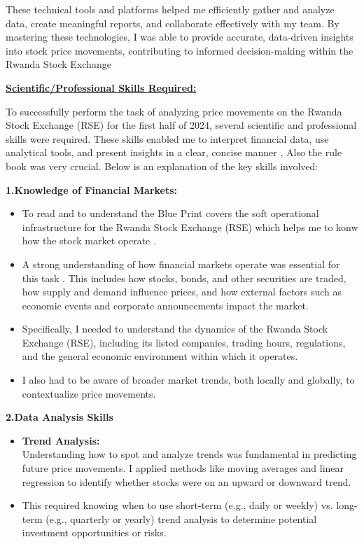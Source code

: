 \documentclass{article}
\begin{document}
\begin{titlepage}
\begin{titlepage}
\begin{flushleft}
These technical tools and platforms helped me efficiently gather and analyze data, create meaningful reports, and collaborate effectively with my team. By mastering these technologies, I was able to provide accurate, data-driven insights into stock price movements, contributing to informed decision-making within the Rwanda Stock Exchange

\vspace{0.5cm}

\newpage

\begin{flushleft}
    \textbf{\underline{Scientific/Professional Skills Required:}}
\vspace{0.3cm}

To successfully perform the task of analyzing price movements on the Rwanda Stock Exchange (RSE) for the first half of 2024, several scientific and professional skills were required. These skills enabled me to interpret financial data, use analytical tools, and present insights in a clear, concise manner , Also the rule book was very crucial. Below is an explanation of the key skills involved:
\vspace{0.3cm}

\textbf{1.Knowledge of Financial Markets:}
\begin{itemize}
  \item   To read and to understand the Blue Print covers the soft operational infrastructure for the Rwanda Stock Exchange (RSE) which helps me to konw how the stock market operate .  
    \item A strong understanding of how financial markets operate was essential for this task . This includes how stocks, bonds, and other securities are traded, how supply and demand influence prices, and how external factors such as economic events and corporate announcements impact the market.
    \item Specifically, I needed to understand the dynamics of the Rwanda Stock Exchange (RSE), including its listed companies, trading hours, regulations, and the general economic environment within which it operates.
    \item I also had to be aware of broader market trends, both locally and globally, to contextualize price movements.

\end{itemize}
\vspace{0.3cm}

\textbf{2.Data Analysis Skills}
\begin{itemize}
  \item \textbf{Trend Analysis:}
  \\
  Understanding how to spot and analyze trends was fundamental in predicting future price movements. I applied methods like moving averages and linear regression to identify whether stocks were on an upward or downward trend.
  \item This required knowing when to use short-term (e.g., daily or weekly) vs. long-term (e.g., quarterly or yearly) trend analysis to determine potential investment opportunities or risks.
  

\end{itemize}
\end{flushleft}
\end{flushleft}
\end{titlepage}
\end{titlepage}
\end{document}
